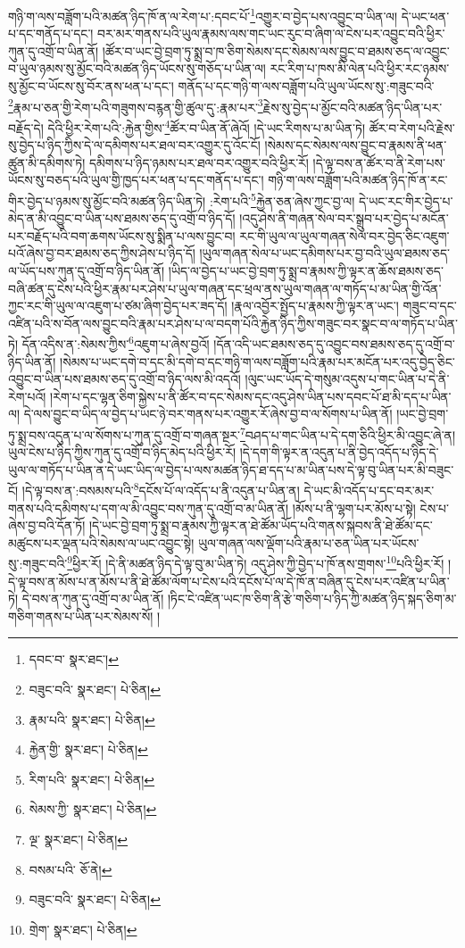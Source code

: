 གཉི་ག་ལས་བཟློག་པའི་མཚན་ཉིད་ཁོ་ན་ལ་རེག་པ་:དབང་པོ་\footnote{དབང་བ་  སྣར་ཐང་། }འགྱུར་བ་བྱེད་པས་འབྱུང་བ་ཡིན་ལ། དེ་ཡང་ཕན་པ་དང་གནོད་པ་དང་། བར་མར་གནས་པའི་ཡུལ་རྣམས་ལས་གང་ཡང་རུང་བ་ཞིག་ལ་ངེས་པར་འབྱུང་བའི་ཕྱིར་ཀུན་དུ་འགྲོ་བ་ཡིན་ནོ། །ཚོར་བ་ཡང་བྱེ་བྲག་ཏུ་སྨྲ་བ་ཁ་ཅིག་སེམས་དང་སེམས་ལས་བྱུང་བ་ཐམས་ཅད་ལ་འབྱུང་བ་ཡུལ་ཉམས་སུ་མྱོང་བའི་མཚན་ཉིད་ཡོངས་སུ་གཅོད་པ་ཡིན་ལ། རང་རིག་པ་ཁས་མི་ལེན་པའི་ཕྱིར་རང་ཉམས་སུ་མྱོང་བ་ཡོངས་སུ་བོར་ནས་ཕན་པ་དང་། གནོད་པ་དང་གཉི་ག་ལས་བཟློག་པའི་ཡུལ་ཡོངས་སུ་:གཟུང་བའི་\footnote{བཟུང་བའི་  སྣར་ཐང་།  པེ་ཅིན། }རྣམ་པ་ཅན་གྱི་རེག་པའི་གཟུགས་བརྙན་གྱི་ཚུལ་དུ་:རྣམ་པར་\footnote{རྣམ་པའི་  སྣར་ཐང་།  པེ་ཅིན། }རྗེས་སུ་བྱེད་པ་མྱོང་བའི་མཚན་ཉིད་ཡིན་པར་བརྗོད་དེ། དེའི་ཕྱིར་རེག་པའི་:རྐྱེན་གྱིས་\footnote{རྐྱེན་གྱི་  སྣར་ཐང་།  པེ་ཅིན། }ཚོར་བ་ཡིན་ནོ་ཞེའོ། །དེ་ཡང་རིགས་པ་མ་ཡིན་ཏེ། ཚོར་བ་རེག་པའི་རྗེས་སུ་བྱེད་པ་ཉིད་ཀྱིས་དེ་ལ་དམིགས་པར་ཐལ་བར་འགྱུར་དུ་འོང་ངོ། །སེམས་དང་སེམས་ལས་བྱུང་བ་རྣམས་ནི་ཕན་ཚུན་མི་དམིགས་ཏེ། དམིགས་པ་ཉིད་ཉམས་པར་ཐལ་བར་འགྱུར་བའི་ཕྱིར་རོ། །དེ་ལྟ་བས་ན་ཚོར་བ་ནི་རེག་པས་ཡོངས་སུ་བཅད་པའི་ཡུལ་གྱི་ཁྱད་པར་ཕན་པ་དང་གནོད་པ་དང་། གཉི་ག་ལས་བཟློག་པའི་མཚན་ཉིད་ཁོ་ན་རང་གིར་བྱེད་པ་ཉམས་སུ་མྱོང་བའི་མཚན་ཉིད་ཡིན་ཏེ། :རེག་པའི་\footnote{རིག་པའི་  སྣར་ཐང་།  པེ་ཅིན། }རྐྱེན་ཅན་ཞེས་ཀྱང་བྱ་ལ། དེ་ཡང་རང་གིར་བྱེད་པ་མེད་ན་མི་འབྱུང་བ་ཡིན་པས་ཐམས་ཅད་དུ་འགྲོ་བ་ཉིད་དོ། །འདུ་ཤེས་ནི་གཞན་སེལ་བར་སྒྲུབ་པར་བྱེད་པ་མངོན་པར་བརྗོད་པའི་བག་ཆགས་ཡོངས་སུ་སྨིན་པ་ལས་བྱུང་བ། རང་གི་ཡུལ་ལ་ཡུལ་གཞན་སེལ་བར་བྱེད་ཅིང་འཇུག་པའོ་ཞེས་བྱ་བར་ཐམས་ཅད་ཀྱིས་ཤེས་པ་ཉིད་དོ། །ཡུལ་གཞན་སེལ་པ་ཡང་དམིགས་པར་བྱ་བའི་ཡུལ་ཐམས་ཅད་ལ་ཡོད་པས་ཀུན་དུ་འགྲོ་བ་ཉིད་ཡིན་ནོ། །ཡིད་ལ་བྱེད་པ་ཡང་བྱེ་བྲག་ཏུ་སྨྲ་བ་རྣམས་ཀྱི་ལྟར་ན་ཆོས་ཐམས་ཅད་བཞི་ཚན་དུ་ངེས་པའི་ཕྱིར་རྣམ་པར་ཤེས་པ་ཡུལ་གཞན་དང་ཕྲལ་ནས་ཡུལ་གཞན་ལ་གཏོད་པ་མ་ཡིན་གྱི་འོན་ཀྱང་རང་གི་ཡུལ་ལ་འཇུག་པ་ཙམ་ཞིག་བྱེད་པར་ཟད་དོ། །རྣལ་འབྱོར་སྤྱོད་པ་རྣམས་ཀྱི་ལྟར་ན་ཡང་། གཟུང་བ་དང་འཛིན་པའི་ས་བོན་ལས་བྱུང་བའི་རྣམ་པར་ཤེས་པ་ལ་བདག་པོའི་རྐྱེན་ཉིད་ཀྱིས་གཟུང་བར་སྣང་བ་ལ་གཏོད་པ་ཡིན་ཏེ། དོན་འདིས་ན་:སེམས་ཀྱིས་\footnote{སེམས་ཀྱི་  སྣར་ཐང་།  པེ་ཅིན། }འཇུག་པ་ཞེས་བྱའོ། །དོན་འདི་ཡང་ཐམས་ཅད་དུ་འབྱུང་བས་ཐམས་ཅད་དུ་འགྲོ་བ་ཉིད་ཡིན་ནོ། །སེམས་པ་ཡང་དགེ་བ་དང་མི་དགེ་བ་དང་གཉི་ག་ལས་བཟློག་པའི་རྣམ་པར་མངོན་པར་འདུ་བྱེད་ཅིང་འབྱུང་བ་ཡིན་པས་ཐམས་ཅད་དུ་འགྲོ་བ་ཉིད་ལས་མི་འདའོ། །ལུང་ཡང་ཡོད་དེ་གསུམ་འདུས་པ་གང་ཡིན་པ་དེ་ནི་རེག་པའོ། །རེག་པ་དང་ལྷན་ཅིག་སྐྱེས་པ་ནི་ཚོར་བ་དང་སེམས་དང་འདུ་ཤེས་ཡིན་པས་དབང་པོ་ཐ་མི་དད་པ་ཡིན་ལ། དེ་ལས་བྱུང་བ་ཡིད་ལ་བྱེད་པ་ཡང་ཉེ་བར་གནས་པར་འགྱུར་རོ་ཞེས་བྱ་བ་ལ་སོགས་པ་ཡིན་ནོ། །ཡང་བྱེ་བྲག་ཏུ་སྨྲ་བས་འདུན་པ་ལ་སོགས་པ་ཀུན་དུ་འགྲོ་བ་གཞན་སྔར་\footnote{ལྔ་  སྣར་ཐང་།  པེ་ཅིན། }བཤད་པ་གང་ཡིན་པ་དེ་དག་ཅིའི་ཕྱིར་མི་འབྱུང་ཞེ་ན། ཡུལ་ངེས་པ་ཉིད་ཀྱིས་ཀུན་དུ་འགྲོ་བ་ཉིད་མེད་པའི་ཕྱིར་རོ། །དེ་དག་གི་ལྟར་ན་འདུན་པ་ནི་བྱེད་འདོད་པ་ཉིད་དེ་ཡུལ་ལ་གཏོད་པ་ཡིན་ན་དེ་ཡང་ཡིད་ལ་བྱེད་པ་ལས་མཚན་ཉིད་ཐ་དད་པ་མ་ཡིན་པས་དེ་ལྟ་བུ་ཡིན་པར་མི་བཟུང་ངོ། །དེ་ལྟ་བས་ན་:བསམས་པའི་\footnote{བསམ་པའི་  ཅོ་ནེ། }དངོས་པོ་ལ་འདོད་པ་ནི་འདུན་པ་ཡིན་ན། དེ་ཡང་མི་འདོད་པ་དང་བར་མར་གནས་པའི་དམིགས་པ་དག་ལ་མི་འབྱུང་བས་ཀུན་དུ་འགྲོ་བ་མ་ཡིན་ནོ། །མོས་པ་ནི་ལྷག་པར་མོས་པ་སྟེ། ངེས་པ་ཞེས་བྱ་བའི་དོན་ཏོ། །དེ་ཡང་བྱེ་བྲག་ཏུ་སྨྲ་བ་རྣམས་ཀྱི་ལྟར་ན་ཐེ་ཚོམ་ཡོད་པའི་གནས་སྐབས་ནི་ཐེ་ཚོམ་དང་མཚུངས་པར་ལྡན་པའི་སེམས་ལ་ཡང་འབྱུང་སྟེ། ཡུལ་གཞན་ལས་ལྡོག་པའི་རྣམ་པ་ཅན་ཡིན་པར་ཡོངས་སུ་:གཟུང་བའི་\footnote{བཟུང་བའི་  སྣར་ཐང་།  པེ་ཅིན། }ཕྱིར་རོ། །དེ་ནི་མཚན་ཉིད་དེ་ལྟ་བུ་མ་ཡིན་ཏེ། འདུ་ཤེས་ཀྱི་བྱེད་པ་ཁོ་ནས་གྲགས་\footnote{གྲེག་  སྣར་ཐང་།  པེ་ཅིན། }པའི་ཕྱིར་རོ། །དེ་ལྟ་བས་ན་མོས་པ་ན་མོས་པ་ནི་ཐེ་ཚོམ་ལོག་པ་ངེས་པའི་དངོས་པོ་ལ་དེ་ཁོ་ན་བཞིན་དུ་ངེས་པར་འཛིན་པ་ཡིན་ཏེ། དེ་བས་ན་ཀུན་དུ་འགྲོ་བ་མ་ཡིན་ནོ། །ཏིང་ངེ་འཛིན་ཡང་ཁ་ཅིག་ནི་རྩེ་གཅིག་པ་ཉིད་ཀྱི་མཚན་ཉིད་སྐད་ཅིག་མ་གཅིག་གནས་པ་ཡིན་པར་སེམས་སོ། །
